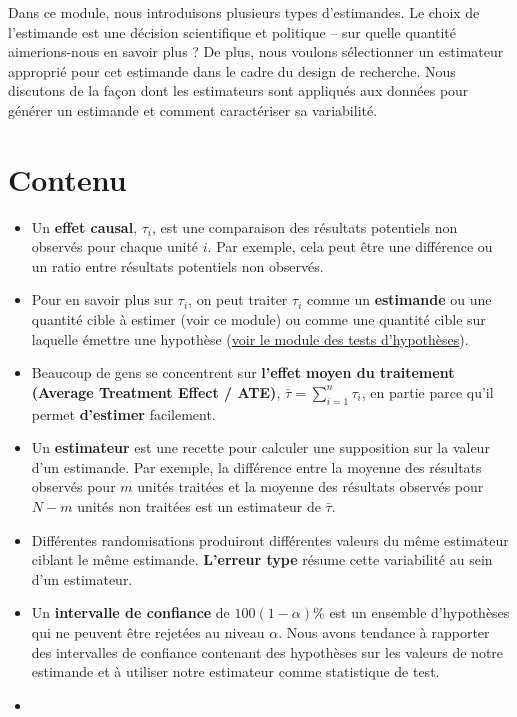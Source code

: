 \documentclass[
  12pt,
]{book}
\begin{document}
Dans ce module, nous introduisons plusieurs types d'estimandes. Le choix de l'estimande est une décision scientifique et politique -- sur quelle quantité aimerions-nous en savoir plus ? De plus, nous voulons sélectionner un estimateur approprié pour cet estimande dans le cadre du design de recherche. Nous discutons de la façon dont les estimateurs sont appliqués aux données pour générer un estimande et comment caractériser sa variabilité.

\hypertarget{contenu-4}{%
\section{Contenu}\label{contenu-4}}

\begin{itemize}
\item
  Un \textbf{effet causal}, \(\tau_i\), est une comparaison des résultats potentiels non observés pour chaque unité \(i\). Par exemple, cela peut être une différence ou un ratio entre résultats potentiels non observés.
\item
  Pour en savoir plus sur \(\tau_{i}\), on peut traiter \(\tau_{i}\) comme un \textbf{estimande} ou une quantité cible à estimer (voir ce module)
  ou comme une quantité cible sur laquelle émettre une hypothèse (\href{hypothesis-testing.html}{voir le module des tests d'hypothèses}).
\item
  Beaucoup de gens se concentrent sur \textbf{l'effet moyen du traitement (Average Treatment Effect / ATE)}, \(\bar{\tau}=\sum_{i=1}^n  \tau_{i}\), en partie parce qu'il permet \textbf{d'estimer} facilement.
\item
  Un \textbf{estimateur} est une recette pour calculer une supposition sur la valeur d'un estimande. Par exemple, la différence entre la moyenne des résultats observés pour \(m\) unités traitées et la moyenne des résultats observés pour \(N-m\) unités non traitées est un estimateur de \(\bar{\tau}\).
\item
  Différentes randomisations produiront différentes valeurs du même estimateur ciblant le même estimande. \textbf{L'erreur type} résume cette variabilité au sein d'un estimateur.
\item
  Un \textbf{intervalle de confiance} de \(100(1-\alpha)\)\% est un ensemble d'hypothèses qui ne peuvent être rejetées au niveau \(\alpha\). Nous avons tendance à rapporter des intervalles de confiance contenant des hypothèses sur les valeurs de notre estimande et à utiliser notre estimateur comme statistique de test.
\item

\end{itemize}
\end{document}
